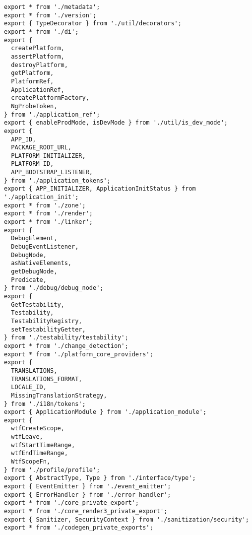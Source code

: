\begin{verbatim}
export * from './metadata';
export * from './version';
export { TypeDecorator } from './util/decorators';
export * from './di';
export {
  createPlatform,
  assertPlatform,
  destroyPlatform,
  getPlatform,
  PlatformRef,
  ApplicationRef,
  createPlatformFactory,
  NgProbeToken,
} from './application_ref';
export { enableProdMode, isDevMode } from './util/is_dev_mode';
export {
  APP_ID,
  PACKAGE_ROOT_URL,
  PLATFORM_INITIALIZER,
  PLATFORM_ID,
  APP_BOOTSTRAP_LISTENER,
} from './application_tokens';
export { APP_INITIALIZER, ApplicationInitStatus } from './application_init';
export * from './zone';
export * from './render';
export * from './linker';
export {
  DebugElement,
  DebugEventListener,
  DebugNode,
  asNativeElements,
  getDebugNode,
  Predicate,
} from './debug/debug_node';
export {
  GetTestability,
  Testability,
  TestabilityRegistry,
  setTestabilityGetter,
} from './testability/testability';
export * from './change_detection';
export * from './platform_core_providers';
export {
  TRANSLATIONS,
  TRANSLATIONS_FORMAT,
  LOCALE_ID,
  MissingTranslationStrategy,
} from './i18n/tokens';
export { ApplicationModule } from './application_module';
export {
  wtfCreateScope,
  wtfLeave,
  wtfStartTimeRange,
  wtfEndTimeRange,
  WtfScopeFn,
} from './profile/profile';
export { AbstractType, Type } from './interface/type';
export { EventEmitter } from './event_emitter';
export { ErrorHandler } from './error_handler';
export * from './core_private_export';
export * from './core_render3_private_export';
export { Sanitizer, SecurityContext } from './sanitization/security';
export * from './codegen_private_exports';
\end{verbatim}

